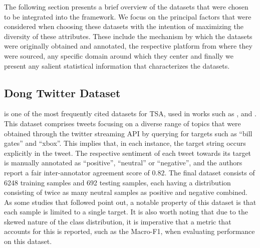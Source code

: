 \documentclass[../../fyp.tex]{subfiles}
\begin{document}
The following section presents a brief overview of the datasets that were chosen to be integrated into the framework. We focus on the principal factors that were considered when choosing these datasets with the intention of maximizing the diversity of these attributes. These include the mechanism by which the datasets were originally obtained and annotated, the respective platform from where they were sourced, any specific domain around which they center and finally we present any salient statistical information that characterizes the datasets.

\subsection{Dong Twitter Dataset} \label{ds:dong}
\cite{dong} is one of the most frequently cited datasets for TSA, used in works such as \cite{tang2016b}, \cite{chen2017} and \cite{zheng2018}. This dataset comprises tweets focusing on a diverse range of topics that were obtained through the twitter streaming API by querying for targets such as \enquote{bill gates} and \enquote{xbox}. This implies that, in each instance, the target string occurs explicitly in the tweet. The respective sentiment of each tweet towards its target is manually annotated as \enquote{positive}, \enquote{neutral} or \enquote{negative}, and the authors report a fair inter-annotator agreement score of $0.82$.  The final dataset consists of 6248 training samples and 692 testing samples, each having a distribution consisting of twice as many neutral samples as positive and negative combined. As some studies \cite{wang2017} \cite{saeidi2016} that followed point out, a notable property of this dataset is that each sample is limited to a single target. It is also worth noting that due to the skewed nature of the class distribution, it is imperative that a metric that accounts for this is reported, such as the Macro-F1, when evaluating performance on this dataset.
\end{document}
